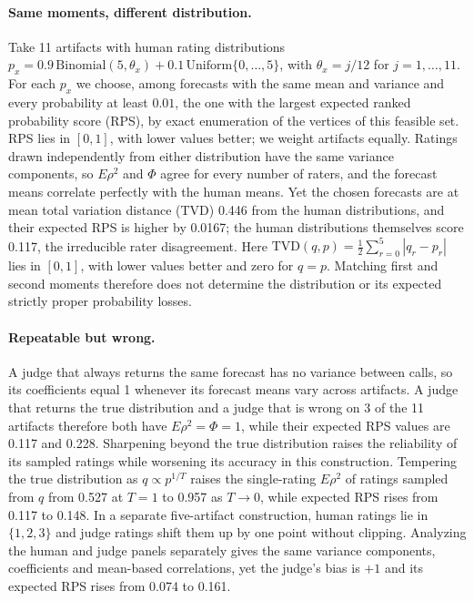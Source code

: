 \paragraph{Same moments, different distribution.}
Take 11 artifacts with human rating distributions $p_x=0.9\,\mathrm{Binomial}(5,\theta_x)+0.1\,\mathrm{Uniform}\{0,\dots,5\}$, with $\theta_x=j/12$ for $j=1,\dots,11$.
For each $p_x$ we choose, among forecasts with the same mean and variance and every probability at least $0.01$, the one with the largest expected ranked probability score (RPS), by exact enumeration of the vertices of this feasible set.
RPS lies in $[0,1]$, with lower values better; we weight artifacts equally.
Ratings drawn independently from either distribution have the same variance components, so $E\rho^2$ and $\Phi$ agree for every number of raters, and the forecast means correlate perfectly with the human means.
Yet the chosen forecasts are at mean total variation distance (TVD) 0.446 from the human distributions, and their expected RPS is higher by 0.0167; the human distributions themselves score 0.117, the irreducible rater disagreement.
Here $\mathrm{TVD}(q,p)=\tfrac12\sum_{r=0}^5|q_r-p_r|$ lies in $[0,1]$, with lower values better and zero for $q=p$.
Matching first and second moments therefore does not determine the distribution or its expected strictly proper probability losses.

\paragraph{Repeatable but wrong.}
A judge that always returns the same forecast has no variance between calls, so its coefficients equal 1 whenever its forecast means vary across artifacts.
A judge that returns the true distribution and a judge that is wrong on 3 of the 11 artifacts therefore both have $E\rho^2=\Phi=1$, while their expected RPS values are 0.117 and 0.228.
Sharpening beyond the true distribution raises the reliability of its sampled ratings while worsening its accuracy in this construction.
Tempering the true distribution as $q\propto p^{1/T}$ raises the single-rating $E\rho^2$ of ratings sampled from $q$ from 0.527 at $T=1$ to 0.957 as $T\to0$, while expected RPS rises from 0.117 to 0.148.
In a separate five-artifact construction, human ratings lie in $\{1,2,3\}$ and judge ratings shift them up by one point without clipping.
Analyzing the human and judge panels separately gives the same variance components, coefficients and mean-based correlations, yet the judge's bias is $+1$ and its expected RPS rises from 0.074 to 0.161.

